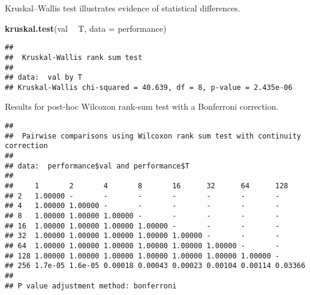 \documentclass[]{book}
\newenvironment{Shaded}{\begin{snugshade}}{\end{snugshade}}
\newcommand{\DataTypeTok}[1]{\textcolor[rgb]{0.13,0.29,0.53}{#1}}
\newcommand{\KeywordTok}[1]{\textcolor[rgb]{0.13,0.29,0.53}{\textbf{#1}}}
\newcommand{\NormalTok}[1]{#1}
\newcommand{\OperatorTok}[1]{\textcolor[rgb]{0.81,0.36,0.00}{\textbf{#1}}}
\newcommand{\OtherTok}[1]{\textcolor[rgb]{0.56,0.35,0.01}{#1}}
\newcommand{\StringTok}[1]{\textcolor[rgb]{0.31,0.60,0.02}{#1}}
\begin{document}
Kruskal--Wallis test illustrates evidence of statistical differences.

\begin{Shaded}
\begin{Highlighting}[]
\KeywordTok{kruskal.test}\NormalTok{(val }\OperatorTok{~}\StringTok{ }\NormalTok{T, }\DataTypeTok{data =}\NormalTok{ performance)}
\end{Highlighting}
\end{Shaded}

\begin{verbatim}
## 
##  Kruskal-Wallis rank sum test
## 
## data:  val by T
## Kruskal-Wallis chi-squared = 40.639, df = 8, p-value = 2.435e-06
\end{verbatim}

Results for post-hoc Wilcoxon rank-sum test with a Bonferroni correction.

\begin{Shaded}
\end{Shaded}

\begin{verbatim}
## 
##  Pairwise comparisons using Wilcoxon rank sum test with continuity correction 
## 
## data:  performance$val and performance$T 
## 
##     1       2       4       8       16      32      64      128    
## 2   1.00000 -       -       -       -       -       -       -      
## 4   1.00000 1.00000 -       -       -       -       -       -      
## 8   1.00000 1.00000 1.00000 -       -       -       -       -      
## 16  1.00000 1.00000 1.00000 1.00000 -       -       -       -      
## 32  1.00000 1.00000 1.00000 1.00000 1.00000 -       -       -      
## 64  1.00000 1.00000 1.00000 1.00000 1.00000 1.00000 -       -      
## 128 1.00000 1.00000 1.00000 1.00000 1.00000 1.00000 1.00000 -      
## 256 1.7e-05 1.6e-05 0.00018 0.00043 0.00023 0.00104 0.00114 0.03366
## 
## P value adjustment method: bonferroni
\end{verbatim}
\end{document}
